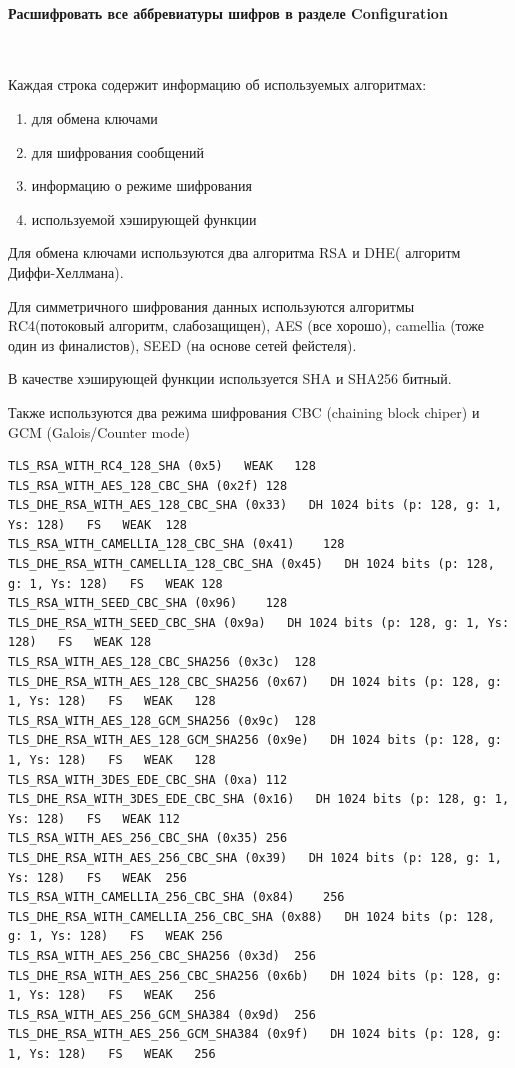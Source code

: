 \documentclass{article}
\begin{document}
\paragraph{Расшифровать все аббревиатуры шифров в разделе Configuration}
~

Каждая строка содержит информацию об используемых алгоритмах:
\begin{enumerate}
\item для обмена ключами
\item для шифрования сообщений
\item информацию о режиме шифрования
\item используемой хэширующей функции
\end{enumerate}

Для обмена ключами используются два алгоритма RSA и DHE( алгоритм Диффи-Хеллмана).

Для симметричного шифрования данных используются алгоритмы RC4(потоковый алгоритм, слабозащищен), AES (все хорошо), camellia (тоже один из финалистов), SEED (на основе сетей фейстеля).

В качестве хэширующей функции используется SHA и SHA256 битный.

Также используются два режима шифрования CBC  (chaining block chiper) и GCM (Galois/Counter mode)
\small
\begin{verbatim}
TLS_RSA_WITH_RC4_128_SHA (0x5)   WEAK	128
TLS_RSA_WITH_AES_128_CBC_SHA (0x2f)	128
TLS_DHE_RSA_WITH_AES_128_CBC_SHA (0x33)   DH 1024 bits (p: 128, g: 1, Ys: 128)   FS   WEAK	128
TLS_RSA_WITH_CAMELLIA_128_CBC_SHA (0x41)	128
TLS_DHE_RSA_WITH_CAMELLIA_128_CBC_SHA (0x45)   DH 1024 bits (p: 128, g: 1, Ys: 128)   FS   WEAK	128
TLS_RSA_WITH_SEED_CBC_SHA (0x96)	128
TLS_DHE_RSA_WITH_SEED_CBC_SHA (0x9a)   DH 1024 bits (p: 128, g: 1, Ys: 128)   FS   WEAK	128
TLS_RSA_WITH_AES_128_CBC_SHA256 (0x3c)	128
TLS_DHE_RSA_WITH_AES_128_CBC_SHA256 (0x67)   DH 1024 bits (p: 128, g: 1, Ys: 128)   FS   WEAK	128
TLS_RSA_WITH_AES_128_GCM_SHA256 (0x9c)	128
TLS_DHE_RSA_WITH_AES_128_GCM_SHA256 (0x9e)   DH 1024 bits (p: 128, g: 1, Ys: 128)   FS   WEAK	128
TLS_RSA_WITH_3DES_EDE_CBC_SHA (0xa)	112
TLS_DHE_RSA_WITH_3DES_EDE_CBC_SHA (0x16)   DH 1024 bits (p: 128, g: 1, Ys: 128)   FS   WEAK	112
TLS_RSA_WITH_AES_256_CBC_SHA (0x35)	256
TLS_DHE_RSA_WITH_AES_256_CBC_SHA (0x39)   DH 1024 bits (p: 128, g: 1, Ys: 128)   FS   WEAK	256
TLS_RSA_WITH_CAMELLIA_256_CBC_SHA (0x84)	256
TLS_DHE_RSA_WITH_CAMELLIA_256_CBC_SHA (0x88)   DH 1024 bits (p: 128, g: 1, Ys: 128)   FS   WEAK	256
TLS_RSA_WITH_AES_256_CBC_SHA256 (0x3d)	256
TLS_DHE_RSA_WITH_AES_256_CBC_SHA256 (0x6b)   DH 1024 bits (p: 128, g: 1, Ys: 128)   FS   WEAK	256
TLS_RSA_WITH_AES_256_GCM_SHA384 (0x9d)	256
TLS_DHE_RSA_WITH_AES_256_GCM_SHA384 (0x9f)   DH 1024 bits (p: 128, g: 1, Ys: 128)   FS   WEAK	256
\end{verbatim}
\end{document}
